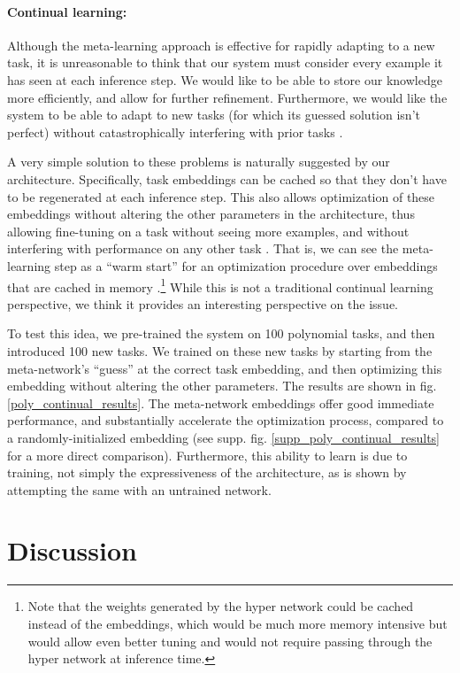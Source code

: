 \documentclass{article}
\begin{document}
\paragraph{Continual learning:} Although the meta-learning approach is effective for rapidly adapting to a new task, it is unreasonable to think that our system must consider every example it has seen at each inference step. We would like to be able to store our knowledge more efficiently, and allow for further refinement. Furthermore, we would like the system to be able to adapt to new tasks (for which its guessed solution isn't perfect) without catastrophically interfering with prior tasks \citep{McCloskey1989}. \par
A very simple solution to these problems is naturally suggested by our architecture. Specifically, task embeddings can be cached so that they don't have to be regenerated at each inference step. This also allows optimization of these embeddings without altering the other parameters in the architecture, thus allowing fine-tuning on a task without seeing more examples, and without interfering with performance on any other task \citep[cf.][]{Rumelhart1993, Lampinen2018a}. That is, we can see the meta-learning step as a ``warm start'' for an optimization procedure over embeddings that are cached in memory \citep[cf.][]{Kumaran2016}.\footnote{Note that the weights generated by the hyper network could be cached instead of the embeddings, which would be much more memory intensive but would allow even better tuning and would not require passing through the hyper network at inference time.} While this is not a traditional continual learning perspective, we think it provides an interesting perspective on the issue.\par 
To test this idea, we pre-trained the system on 100 polynomial tasks, and then introduced 100 new tasks. We trained on these new tasks by starting from the meta-network's ``guess'' at the correct task embedding, and then optimizing this embedding without altering the other parameters. The results are shown in fig. \ref{poly_continual_results}. The meta-network embeddings offer good immediate performance, and substantially accelerate the optimization process, compared to a randomly-initialized embedding (see supp. fig. \ref{supp_poly_continual_results} for a more direct comparison). Furthermore, this ability to learn is due to training, not simply the expressiveness of the architecture, as is shown by attempting the same with an untrained network. \par 
\section{Discussion} \label{sec_discussion}
\vspace{-0.5em} %
\end{document}
